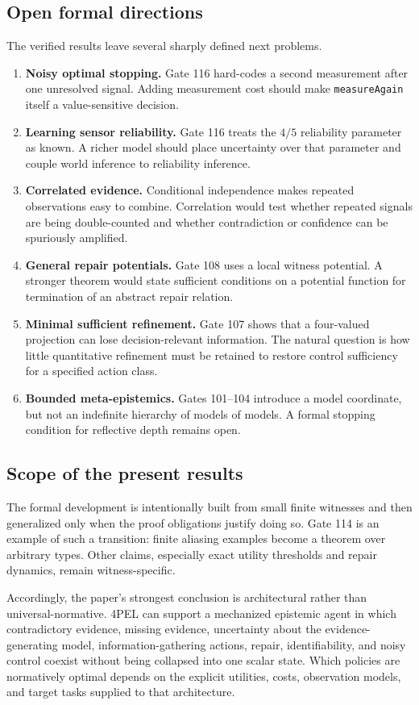 \subsection{Open formal directions}

The verified results leave several sharply defined next problems.

\begin{enumerate}
  \item \textbf{Noisy optimal stopping.} Gate 116 hard-codes a second measurement after one unresolved signal. Adding measurement cost should make \texttt{measureAgain} itself a value-sensitive decision.
  \item \textbf{Learning sensor reliability.} Gate 116 treats the $4/5$ reliability parameter as known. A richer model should place uncertainty over that parameter and couple world inference to reliability inference.
  \item \textbf{Correlated evidence.} Conditional independence makes repeated observations easy to combine. Correlation would test whether repeated signals are being double-counted and whether contradiction or confidence can be spuriously amplified.
  \item \textbf{General repair potentials.} Gate 108 uses a local witness potential. A stronger theorem would state sufficient conditions on a potential function for termination of an abstract repair relation.
  \item \textbf{Minimal sufficient refinement.} Gate 107 shows that a four-valued projection can lose decision-relevant information. The natural question is how little quantitative refinement must be retained to restore control sufficiency for a specified action class.
  \item \textbf{Bounded meta-epistemics.} Gates 101--104 introduce a model coordinate, but not an indefinite hierarchy of models of models. A formal stopping condition for reflective depth remains open.
\end{enumerate}

\subsection{Scope of the present results}

The formal development is intentionally built from small finite witnesses and then generalized only when the proof obligations justify doing so. Gate 114 is an example of such a transition: finite aliasing examples become a theorem over arbitrary types. Other claims, especially exact utility thresholds and repair dynamics, remain witness-specific.

Accordingly, the paper's strongest conclusion is architectural rather than universal-normative. 4PEL can support a mechanized epistemic agent in which contradictory evidence, missing evidence, uncertainty about the evidence-generating model, information-gathering actions, repair, identifiability, and noisy control coexist without being collapsed into one scalar state. Which policies are normatively optimal depends on the explicit utilities, costs, observation models, and target tasks supplied to that architecture.
